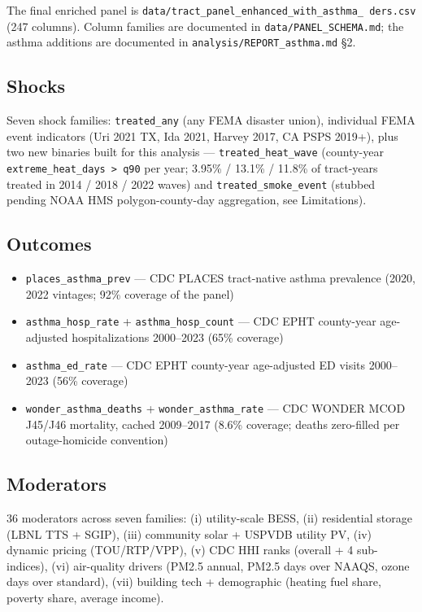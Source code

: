 \documentclass[
]{article}
\providecommand{\tightlist}{%
  \setlength{\itemsep}{0pt}\setlength{\parskip}{0pt}}
\begin{document}
The final enriched panel is
\texttt{data/tract\_panel\_enhanced\_with\_asthma\_\ ders.csv} (247
columns). Column families are documented in
\texttt{data/PANEL\_SCHEMA.md}; the asthma additions are documented in
\texttt{analysis/REPORT\_asthma.md} §2.

\hypertarget{shocks}{%
\subsection{Shocks}\label{shocks}}

Seven shock families: \texttt{treated\_any} (any FEMA disaster union),
individual FEMA event indicators (Uri 2021 TX, Ida 2021, Harvey 2017, CA
PSPS 2019+), plus two new binaries built for this analysis ---
\texttt{treated\_heat\_wave} (county-year
\texttt{extreme\_heat\_days\ \textgreater{}\ q90} per year; 3.95\% /
13.1\% / 11.8\% of tract-years treated in 2014 / 2018 / 2022 waves) and
\texttt{treated\_smoke\_event} (stubbed pending NOAA HMS
polygon-county-day aggregation, see Limitations).

\hypertarget{outcomes}{%
\subsection{Outcomes}\label{outcomes}}

\begin{itemize}
\tightlist
\item
  \texttt{places\_asthma\_prev} --- CDC PLACES tract-native asthma
  prevalence (2020, 2022 vintages; 92\% coverage of the panel)
\item
  \texttt{asthma\_hosp\_rate} + \texttt{asthma\_hosp\_count} --- CDC
  EPHT county-year age-adjusted hospitalizations 2000--2023 (65\%
  coverage)
\item
  \texttt{asthma\_ed\_rate} --- CDC EPHT county-year age-adjusted ED
  visits 2000--2023 (56\% coverage)
\item
  \texttt{wonder\_asthma\_deaths} + \texttt{wonder\_asthma\_rate} ---
  CDC WONDER MCOD J45/J46 mortality, cached 2009--2017 (8.6\% coverage;
  deaths zero-filled per outage-homicide convention)
\end{itemize}

\hypertarget{moderators}{%
\subsection{Moderators}\label{moderators}}

36 moderators across seven families: (i) utility-scale BESS, (ii)
residential storage (LBNL TTS + SGIP), (iii) community solar + USPVDB
utility PV, (iv) dynamic pricing (TOU/RTP/VPP), (v) CDC HHI ranks
(overall + 4 sub-indices), (vi) air-quality drivers (PM2.5 annual, PM2.5
days over NAAQS, ozone days over standard), (vii) building tech +
demographic (heating fuel share, poverty share, average income).
\end{document}
